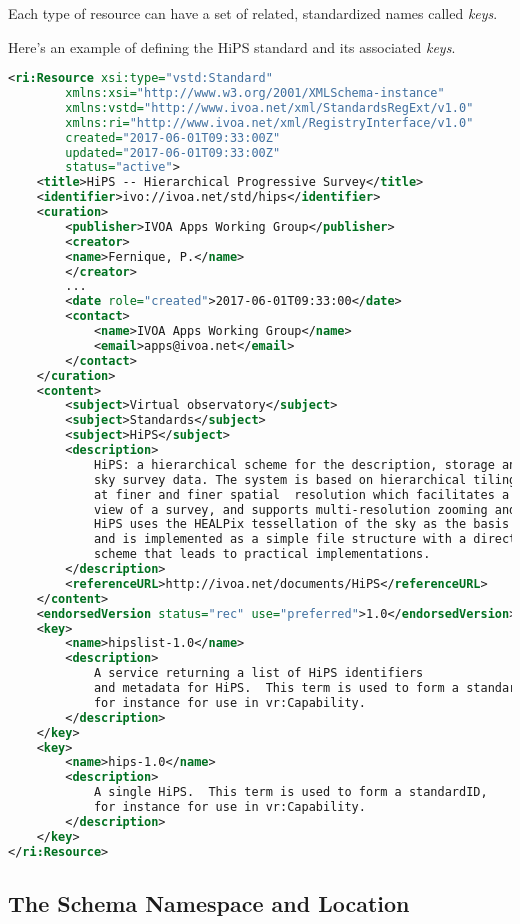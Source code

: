 \documentclass[11pt,a4paper]{ivoa}
\begin{document}
Each type of resource can have a set of related, standardized names called \emph{keys}.

Here's an example of defining the HiPS standard and its associated \emph{keys}.

\begin{lstlisting}[language=xml]
<ri:Resource xsi:type="vstd:Standard"
		xmlns:xsi="http://www.w3.org/2001/XMLSchema-instance"
		xmlns:vstd="http://www.ivoa.net/xml/StandardsRegExt/v1.0"
		xmlns:ri="http://www.ivoa.net/xml/RegistryInterface/v1.0"
		created="2017-06-01T09:33:00Z"
		updated="2017-06-01T09:33:00Z"
		status="active">
  	<title>HiPS -- Hierarchical Progressive Survey</title>
  	<identifier>ivo://ivoa.net/std/hips</identifier>
  	<curation>
    	<publisher>IVOA Apps Working Group</publisher>
    	<creator>
      	<name>Fernique, P.</name>
    	</creator>
    	...
    	<date role="created">2017-06-01T09:33:00</date>
    	<contact>
      		<name>IVOA Apps Working Group</name>
      		<email>apps@ivoa.net</email>
    	</contact>
  	</curation>
  	<content>
    	<subject>Virtual observatory</subject>
    	<subject>Standards</subject>
    	<subject>HiPS</subject>
		<description>
			HiPS: a hierarchical scheme for the description, storage and access of 
			sky survey data. The system is based on hierarchical tiling of sky regions 
			at finer and finer spatial  resolution which facilitates a progressive 
			view of a survey, and supports multi-resolution zooming and panning. 
			HiPS uses the HEALPix tessellation of the sky as the basis for the scheme
			and is implemented as a simple file structure with a direct indexing
			scheme that leads to practical implementations.
		</description>
    	<referenceURL>http://ivoa.net/documents/HiPS</referenceURL>
  	</content>
  	<endorsedVersion status="rec" use="preferred">1.0</endorsedVersion>
	<key>
		<name>hipslist-1.0</name>
		<description>
			A service returning a list of HiPS identifiers
			and metadata for HiPS.  This term is used to form a standardID,
			for instance for use in vr:Capability.
		</description>
	</key>
	<key>
		<name>hips-1.0</name>
		<description>
			A single HiPS.  This term is used to form a standardID,
			for instance for use in vr:Capability.
		</description>
	</key>
</ri:Resource>
\end{lstlisting}




\subsection{The Schema Namespace and Location}
\end{document}

